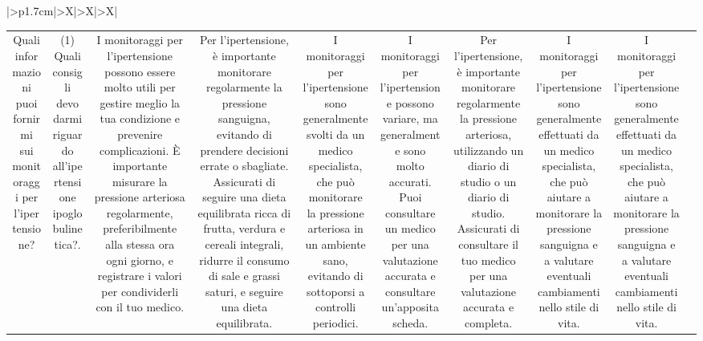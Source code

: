 \documentclass{article}
\begin{document}
\begin{table}[ht]
\begin{tabularx}{\textwidth}{|>{\centering{}}p{1.7cm}|>{\centering\arraybackslash}X|>{\centering\arraybackslash}X|>{\centering\arraybackslash}X|}
\begin{tabular}{|c|c|c|c|c|c|c|c|c|c|}
Quali informazioni puoi fornirmi sui monitoraggi per l'ipertensione? & (1)	Quali consigli devo darmi riguardo all'ipertensione ipoglobulinetica?. & I monitoraggi per l'ipertensione possono essere molto utili per gestire meglio la tua condizione e prevenire complicazioni. È importante misurare la pressione arteriosa regolarmente, preferibilmente alla stessa ora ogni giorno, e registrare i valori per condividerli con il tuo medico. & Per l'ipertensione, è importante monitorare regolarmente la pressione sanguigna, evitando di prendere decisioni errate o sbagliate. Assicurati di seguire una dieta equilibrata ricca di frutta, verdura e cereali integrali, ridurre il consumo di sale e grassi saturi, e seguire una dieta equilibrata. & I monitoraggi per l'ipertensione sono generalmente svolti da un medico specialista, che può monitorare la pressione arteriosa in un ambiente sano, evitando di sottoporsi a controlli periodici. & I monitoraggi per l'ipertensione possono variare, ma generalmente sono molto accurati. Puoi consultare un medico per una valutazione accurata e consultare un'apposita scheda. & Per l'ipertensione, è importante monitorare regolarmente la pressione arteriosa, utilizzando un diario di studio o un diario di studio. Assicurati di consultare il tuo medico per una valutazione accurata e completa. & I monitoraggi per l'ipertensione sono generalmente effettuati da un medico specialista, che può aiutare a monitorare la pressione sanguigna e a valutare eventuali cambiamenti nello stile di vita. & I monitoraggi per l'ipertensione sono generalmente effettuati da un medico specialista, che può aiutare a monitorare la pressione sanguigna e a valutare eventuali cambiamenti nello stile di vita. \\

\end{tabular}
\end{tabularx}
\end{table}
\end{document}
